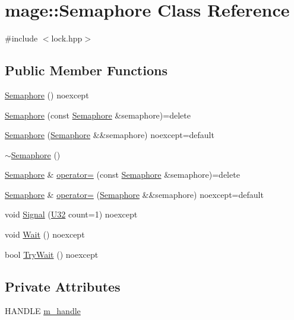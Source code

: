 \hypertarget{classmage_1_1_semaphore}{}\section{mage\+:\+:Semaphore Class Reference}
\label{classmage_1_1_semaphore}


{\ttfamily \#include $<$lock.\+hpp$>$}

\subsection*{Public Member Functions}
\begin{DoxyCompactItemize}
\item 
\hyperlink{classmage_1_1_semaphore_a3733a67071b832a57ec086d52b28fd84}{Semaphore} () noexcept
\item 
\hyperlink{classmage_1_1_semaphore_a8873b2ed82ff66d323a8c3cebf0fb5c0}{Semaphore} (const \hyperlink{classmage_1_1_semaphore}{Semaphore} \&semaphore)=delete
\item 
\hyperlink{classmage_1_1_semaphore_abe3e33b06c3cb3cbfe3fa041ef80434f}{Semaphore} (\hyperlink{classmage_1_1_semaphore}{Semaphore} \&\&semaphore) noexcept=default
\item 
\hyperlink{classmage_1_1_semaphore_a991ed365c28e4a9c63ff34a5efeb012d}{$\sim$\+Semaphore} ()
\item 
\hyperlink{classmage_1_1_semaphore}{Semaphore} \& \hyperlink{classmage_1_1_semaphore_af3308cf7fa1ed33cda0ee53b9565f658}{operator=} (const \hyperlink{classmage_1_1_semaphore}{Semaphore} \&semaphore)=delete
\item 
\hyperlink{classmage_1_1_semaphore}{Semaphore} \& \hyperlink{classmage_1_1_semaphore_ab55e257e8796f441b26eb67edcd4c52d}{operator=} (\hyperlink{classmage_1_1_semaphore}{Semaphore} \&\&semaphore) noexcept=default
\item 
void \hyperlink{classmage_1_1_semaphore_a0b7948e009f0fbdad2b2dc5e9fc420d7}{Signal} (\hyperlink{namespacemage_a41c104c036fba3756a74e19f793eeaa1}{U32} count=1) noexcept
\item 
void \hyperlink{classmage_1_1_semaphore_ab0be313e63792315ee9b227dea1184be}{Wait} () noexcept
\item 
bool \hyperlink{classmage_1_1_semaphore_a46d08edac69437678d05f354f10619de}{Try\+Wait} () noexcept
\end{DoxyCompactItemize}
\subsection*{Private Attributes}
\begin{DoxyCompactItemize}
\item 
H\+A\+N\+D\+LE \hyperlink{classmage_1_1_semaphore_ac1ded856984b4ac3739d9ff627838fda}{m\+\_\+handle}
\end{DoxyCompactItemize}


